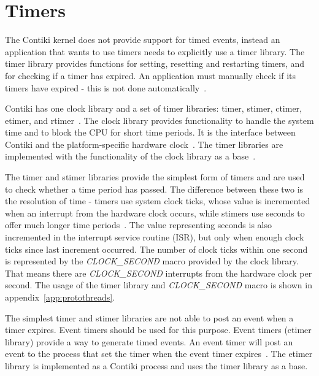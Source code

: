 
\section{Timers}\label{sec:contiki-timers}
The Contiki kernel does not provide support for timed events,
instead an application that wants to use timers needs to explicitly use a timer library.
The timer library provides functions for setting, resetting and restarting timers,
and for checking if a timer has expired.
An application must manually check if its timers have expired - this is not done automatically~\cite{contiki-docs}.

Contiki has one clock library and a set of timer libraries: timer, stimer, ctimer, etimer, and rtimer~\cite{contiki-wiki-timers}.
The clock library provides functionality to handle the system time and to block the CPU for short time periods.
It is the interface between Contiki and the platform-specific hardware clock~\cite{contiki-docs}.
The timer libraries are implemented with the functionality of the clock library as a base~\cite{contiki-wiki-timers}.

The timer and stimer libraries provide the simplest form of timers and are used to check whether a time period has passed.
The difference between these two is the resolution of time -
timers use system clock ticks, whose value is incremented when an interrupt from the hardware clock occurs,
while stimers use seconds to offer much longer time periods~\cite{contiki-wiki-timers}.
The value representing seconds is also incremented in the interrupt service routine (ISR),
but only when enough clock ticks since last increment occurred.
The number of clock ticks within one second is represented by the
{\it{CLOCK\_SECOND}} macro provided by the clock library.
That means there are {\it{CLOCK\_SECOND}} interrupts from the hardware clock per second.
The usage of the timer library and {\it{CLOCK\_SECOND}} macro is shown in appendix~\ref{app:protothreads}.

The simplest timer and stimer libraries are not able to post an event when a timer expires.
Event timers should be used for this purpose.
Event timers (etimer library) provide a way to generate timed events.
An event timer will post an event to the process that set the timer when the
event timer expires~\cite{contiki-docs}.
The etimer library is implemented as a Contiki process and uses the timer library as a base.

